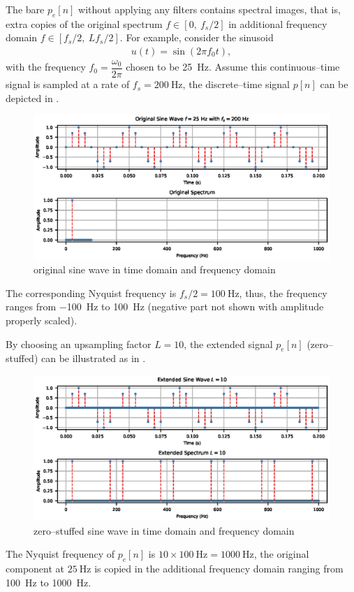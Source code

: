 The bare $p_e[n]$ without applying any filters contains spectral images, that is, extra copies of the original spectrum $f\in[0,~f_s/2]$ in additional frequency domain $f\in[f_s/2,~Lf_s/2]$. For example, consider the sinusoid
\begin{gather}
u(t)=\sin\left(2\pi{}f_0t\right),
\end{gather}
with the frequency $f_0=\dfrac{\omega_0}{2\pi}$ chosen to be \SI{25}{\hertz}. Assume this continuous--time signal is sampled at a rate of $f_s=\SI{200}{\hertz}$, the discrete--time signal $p[n]$ can be depicted in .
\begin{figure}[htb!]
\centering
\includegraphics{PIC/PureSineOrigin}
\caption{original sine wave in time domain and frequency domain}\label{fig:original}
\end{figure}
The corresponding Nyquist frequency is $f_s/2=\SI{100}{\hertz}$, thus, the frequency ranges from \SI{-100}{\hertz} to \SI{100}{\hertz} (negative part not shown with amplitude properly scaled).

By choosing an upsampling factor $L=10$, the extended signal $p_e[n]$ (zero--stuffed) can be illustrated as in .
\begin{figure}[htb!]
\centering
\includegraphics{PIC/PureSineExtended}
\caption{zero--stuffed sine wave in time domain and frequency domain}\label{fig:extended}
\end{figure}
The Nyquist frequency of $p_e[n]$ is $10\times\SI{100}{\hertz}=\SI{1000}{\hertz}$, the original component at $\SI{25}{\hertz}$ is copied in the additional frequency domain ranging from \SI{100}{\hertz} to \SI{1000}{\hertz}.

